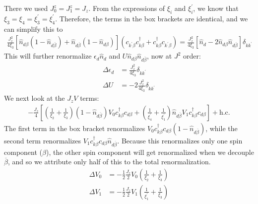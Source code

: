 \documentclass[twoside,11pt]{report}
\numberwithin{equation}{section}
\begin{document}
There we used \(J_0^z = J_1^z = J_z\). From the expressions of \(\xi_i\) and \(\xi_i^\prime\), we know that \(\xi_3 = \xi_4 = \xi_3^\prime = \xi_4^\prime\). Therefore, the terms in the box brackets are identical, and we can simplify this to
\begin{equation}\begin{aligned}
	\frac{J_z^2}{4\xi_3}\left[\hat n_{d\beta}\left( 1 - \hat n_{d\overline\beta} \right) + \hat n_{d\overline\beta}\left( 1 - \hat n_{d\beta} \right) \right]\left(c_{k^\prime\beta}c^\dagger_{k\beta} + c^\dagger_{k\beta}c_{k^\prime\beta}\right) = \frac{J_z^2}{4\xi_3}\left[\hat n_{d} - 2\hat n_{d\beta}\hat n_{d\overline\beta} \right]\delta_{kk^\prime}
\end{aligned}\end{equation}
This will further renormalize \(\epsilon_d \hat n_d\) and \(U\hat n_{d\beta}\hat n_{d\overline\beta}\), now at \(J^2\) order:
\begin{equation}\begin{aligned}
	\label{edU2}
	\Delta \epsilon_d &= \frac{J_z^2}{4\xi_3}\delta_{kk^\prime}\\
	\Delta U &= -2\frac{J_z^2}{4\xi_3}\delta_{kk^\prime}
\end{aligned}\end{equation}
We next look at the \(J_z V\) terms:
\begin{equation}\begin{aligned}
	-\frac{J_z}{4}\left[\left(\frac{1}{\xi_2} + \frac{1}{\xi_3}\right)\left(1 - \hat n_{d\overline\beta}\right)V_0 c^\dagger_{k\beta}c_{d\beta} + \left(\frac{1}{\xi^\prime_4} + \frac{1}{\xi^\prime_1}\right)\hat n_{d\overline\beta} V_1 c^\dagger_{k\beta}c_{d\beta}\right] + \text{h.c.}
\end{aligned}\end{equation}
The first term in the box bracket renormalizes \(V_0 c^\dagger_{k\beta}c_{d\beta}\left(1 - \hat n_{d\overline\beta}\right)\), while the second term renormalizes \(V_1 c^\dagger_{k\beta}c_{d\beta}\hat n_{d\overline\beta}\). Because this renormalizes only one spin component (\(\beta\)), the other spin component will get renormalized when we decouple \(\overline\beta\), and so we attribute only half of this to the total renormalization.
\begin{equation}\begin{aligned}
	\Delta V_0 &= -\frac{1}{2}\frac{J_z}{2}V_0\left(\frac{1}{\xi_2} + \frac{1}{\xi_3}\right)\\
	\Delta V_1 &= -\frac{1}{2}\frac{J_z}{2}V_1\left(\frac{1}{\xi^\prime_1} + \frac{1}{\xi_3}\right)
\end{aligned}\end{equation}
\end{document}
